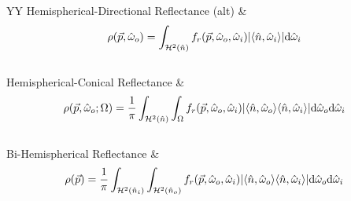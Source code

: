 {\begin{xltabular}{\linewidth}{YY}
		Hemispherical-Directional Reflectance (alt)\footnotemark{} &  \\
			{\begin{equation}\label{chapter3:surface:DHR}\rho(\vec{p},\hat{\omega}_o) = \int_{\mathcal{H}^2(\hat{n})}f_r(\vec{p},\hat{\omega}_o,\hat{\omega}_i)\vert\langle\hat{n},\hat{\omega}_{i}\rangle\vert\mathrm{d}\hat{\omega}_{i}\end{equation}}\\
		Hemispherical-Conical Reflectance &  \\
			{\[\rho(\vec{p}, \hat{\omega}_o;\Omega) = %
			\frac{1}{\pi}\int_{\mathcal{H}^2(\hat{n})}\int_\Omega f_r(\vec{p},\hat{\omega}_o,\hat{\omega}_i)\vert\dotpr{o}%
			\dotpr{i}\vert\mathrm{d}\hat{\omega}_o\mathrm{d}\hat{\omega}_i\]}\\
		Bi-Hemispherical Reflectance &  \\
			{\begin{equation}\rho(\vec{p}) = \frac{1}{\pi}%
			\int_{\mathcal{H}^2(\hat{n}_i)}\int_{\mathcal{H}^2(\hat{n}_o)}f_r(\vec{p},\hat{\omega}_o,\hat{\omega}_i)\vert\dotpr{o}%
			\dotpr{i}\vert\mathrm{d}\hat{\omega}_o\mathrm{d}\hat{\omega}_i\end{equation}}\\
	\end{xltabular}
}
